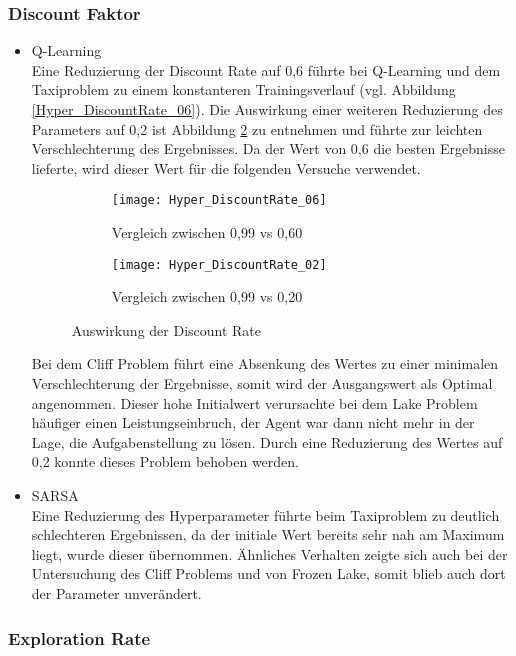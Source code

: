 \subsubsection{Discount Faktor}
\begin{itemize}
    \item Q-Learning\\
    Eine Reduzierung der Discount Rate auf 0,6 führte bei Q-Learning und dem Taxiproblem zu einem konstanteren Trainingsverlauf (vgl. Abbildung \ref{Hyper_DiscountRate_06}).
    Die Auswirkung einer weiteren Reduzierung des Parameters auf 0,2 ist Abbildung \ref{fig:DiscountRate02} zu entnehmen und führte zur leichten Verschlechterung des Ergebnisses.
    Da der Wert von 0,6 die besten Ergebnisse lieferte, wird dieser Wert für die folgenden Versuche verwendet.
    \begin{figure}[H]
        \centering
        \begin{subfigure}{.5\textwidth}
          \centering
          \texttt{[image: Hyper\_DiscountRate\_06]}
          \caption{Vergleich zwischen 0,99 vs 0,60}
          \label{fig:DiscountRate06}
        \end{subfigure}%
        \begin{subfigure}{.5\textwidth}
          \centering
          \texttt{[image: Hyper\_DiscountRate\_02]}
          \caption{Vergleich zwischen 0,99 vs 0,20}
          \label{fig:DiscountRate02}
        \end{subfigure}
        \caption{Auswirkung der Discount Rate}
        \label{fig:DiscountRate_Q-Learning}
    \end{figure}
    Bei dem Cliff Problem führt eine Absenkung des Wertes zu einer minimalen Verschlechterung der Ergebnisse, somit wird der Ausgangswert als Optimal angenommen. 
    Dieser hohe Initialwert verursachte bei dem Lake Problem häufiger einen Leistungseinbruch, der Agent war dann nicht mehr in der Lage, die Aufgabenstellung zu lösen.
    Durch eine Reduzierung des Wertes auf 0,2 konnte dieses Problem behoben werden.
    \item SARSA\\
    Eine Reduzierung des Hyperparameter führte beim Taxiproblem zu deutlich schlechteren Ergebnissen, da der initiale Wert bereits sehr nah am Maximum liegt, wurde dieser übernommen.
Ähnliches Verhalten zeigte sich auch bei der Untersuchung des Cliff Problems und von Frozen Lake, somit blieb auch dort der Parameter unverändert.
\end{itemize}
\subsubsection{Exploration Rate}

